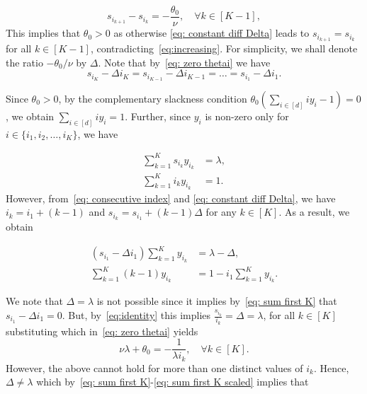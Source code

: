 \documentclass[a4paper]{article}
\theoremstyle{plain}
\theoremstyle{definition}
\theoremstyle{case}
\theoremstyle{remark}
\newcommand{\brac}[1]{\left(#1\right)}
\begin{document}
\begin{enumerate}
\begin{equation} \label{eq: constant diff Delta}
    s_{i_{k+1}} - s_{i_k} = -\frac{\theta_0}{\nu}, \quad \forall k \in [K-1],
\end{equation}
%
This implies that $\theta_0 >0$ as otherwise \eqref{eq: constant diff Delta} leads to $s_{i_{k+1}}=s_{i_k}$ for all $k \in [K-1]$, contradicting~\eqref{eq:increasing}. 
For simplicity, we shall denote the ratio $-\theta_0/\nu$ by $\Delta$. Note that by~\eqref{eq: zero thetai} we have
 \begin{equation}
            s_{i_K} - \Delta i_K = s_{i_{K-1}} - \Delta i_{K-1} = \ldots = s_{i_1} - \Delta i_1.
            \label{eq:identity}
\end{equation}

   
   Since $\theta_0>0$, by the complementary slackness condition $\theta_0 \brac{\sum_{i \in [d]} i y_i -1 }=0$, we obtain $\sum_{i \in [d]} i y_i =1$. Further, since $y_i$ is non-zero only for $i \in \{ i_1, i_2, \ldots, i_K \}$, we have

   \begin{align}
       \sum_{k=1}^K s_{i_k} y_{i_k} &= \lambda,\label{eq:rate}
       \\\sum_{k=1}^K i_k y_{i_k} &= 1.\label{eq:capacity}
   \end{align}
   However, from~\eqref{eq: consecutive index} and \eqref{eq: constant diff Delta}, we have $i_k = i_1 + (k-1)$ and $s_{i_k} = s_{i_1} +  (k-1)\Delta$ for any $k \in [K]$. As a result, we obtain



    \begin{align}
        \brac{s_{i_1} - \Delta i_1} \sum_{k=1}^K y_{i_k} &= \lambda - \Delta,
        \label{eq: sum first K}\\ \sum_{k=1}^K (k-1) y_{i_k} &= 1- i_1 \sum_{k=1}^K y_{i_k}. \label{eq: sum first K scaled}
    \end{align}

    We note that $\Delta = \lambda$ is not possible since it implies by~\eqref{eq: sum first K} that $s_{i_1}-\Delta i_1 =0$. But, by~\eqref{eq:identity} this implies $\frac{s_{i_k}}{i_k} = \Delta = \lambda$, for all $k \in [K]$ substituting which in~\eqref{eq: zero thetai} yields
%
        $$\nu \lambda + \theta_0 = -\frac{1}{\lambda i_k}, \quad \forall k \in [K].$$
%
    However, the above cannot hold for more than one distinct values of $i_k$. Hence, $\Delta \neq \lambda$ which by~\eqref{eq: sum first K}-\eqref{eq: sum first K scaled} implies that


\end{enumerate}
\end{document}
